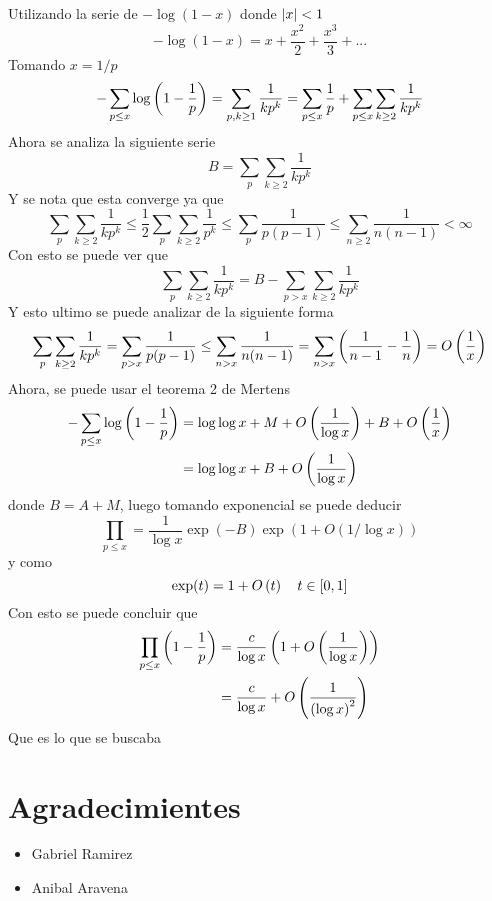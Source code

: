 \begin{sol}
	Utilizando la serie de $-\log (1-x)$ donde $\left|x\right|<1$
	\[-\log (1-x)=x+\frac{x^2}2+\frac{x^3}3+...\]
	Tomando $x=1/p$
	\[-\sum_{p\leq x}\log\left(1-\frac1p\right)=\sum_{p,k\geq1}\frac1{kp^k}=\sum_{p\leq x}\frac1p+\sum_{p\leq x}\sum_{k\geq2}\frac1{kp^k}\]
	Ahora se analiza la siguiente serie
	\[B=\sum_p\sum_{k\geq2}\frac1{kp^k}\]
	Y se nota que esta converge ya que
	\[\sum_p\sum_{k\geq2}\frac1{kp^k}\leq\frac12\sum_p\sum_{k\geq2}\frac1{p^k}\leq\sum_p\frac1{p(p-1)}\leq\sum_{n\geq2}\frac1{n(n-1)}<\infty\]
	Con esto se puede ver que
	\[\sum_p\sum_{k\geq2}\frac1{kp^k}=B-\sum_{p>x}\sum_{k\geq2}\frac1{kp^k}\]
	Y esto ultimo se puede analizar de la siguiente forma
	\[\sum_p\sum_{k\geq2}\frac1{kp^k}=\sum_{p>x}\frac1{p(p-1)}\leq\sum_{n>x}\frac1{n(n-1)}=\sum_{n>x}\left(\frac1{n-1}-\frac1n\right)=O\left(\frac1x\right)\]
	Ahora, se puede usar el teorema 2 de Mertens
	\begin{align*}
		-\sum_{p\leq x}\log\left(1-\frac1p\right) & =\log\log x+M+O\left(\frac1{\log x}\right)+B+O\left(\frac1x\right) \\
		                                     & =\log\log x+B+O\left(\frac1{\log x}\right)
	\end{align*}
	donde $B=A+M$, luego tomando exponencial se puede deducir
	\[\prod_{p\leq x}=\frac1{\log x}\exp(-B)\exp(1+O(1/\log x))\]
	y como
	\[\exp(t)=1+O\left(t\right)\quad t\in[0,1]\]
	Con esto se puede concluir que
	\begin{align*}
		\prod_{p\leq x}\left(1-\frac1p\right) & =\frac{c}{\log x}\left(1+O\left(\frac1{\log x}\right)\right)  \\
		                                 & =\frac{c}{\log x}+O\left(\frac1{\left(\log x\right)^2}\right)
	\end{align*}
	Que es lo que se buscaba\cite{mertens3}
\end{sol}

\section{Agradecimientes}
\begin{multicols}{2}
	\begin{itemize}
		\item Gabriel Ramirez

		\item Anibal Aravena
	\end{itemize}
\end{multicols}




